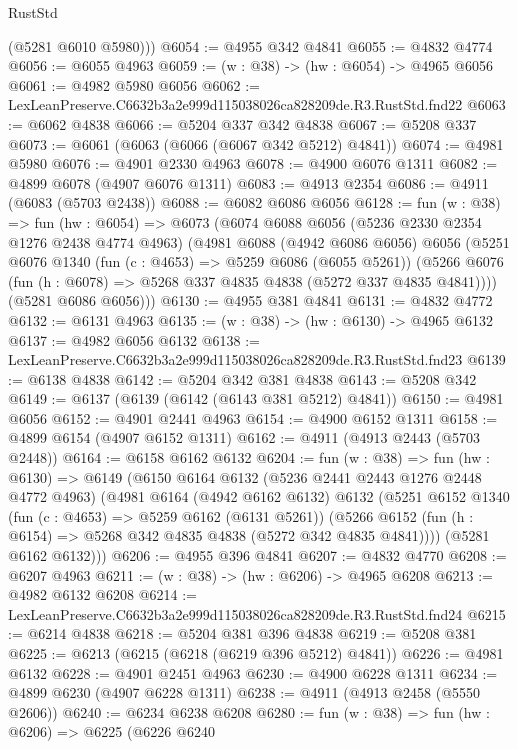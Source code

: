 \begin{lexlean}{RustStd}
\begin{coremodule}
        (@5281 @6010 @5980)))
@6054 := @4955 @342 @4841
@6055 := @4832 @4774
@6056 := @6055 @4963
@6059 := (w : @38) -> (hw : @6054) -> @4965 @6056
@6061 := @4982 @5980 @6056
@6062 := LexLeanPreserve.C6632b3a2e999d115038026ca828209de.R3.RustStd.fnd22
@6063 := @6062 @4838
@6066 := @5204 @337 @342 @4838
@6067 := @5208 @337
@6073 := @6061 (@6063 (@6066 (@6067 @342 @5212) @4841))
@6074 := @4981 @5980
@6076 := @4901 @2330 @4963
@6078 := @4900 @6076 @1311
@6082 := @4899 @6078 (@4907 @6076 @1311)
@6083 := @4913 @2354
@6086 := @4911 (@6083 (@5703 @2438))
@6088 := @6082 @6086 @6056
@6128 := fun (w : @38) =>
  fun (hw : @6054) =>
  @6073
    (@6074
      @6088
      @6056
      (@5236 @2330 @2354 @1276 @2438 @4774 @4963)
      (@4981
        @6088
        (@4942 @6086 @6056)
        @6056
        (@5251
          @6076
          @1340
          (fun (c : @4653) => @5259 @6086 (@6055 @5261))
          (@5266 @6076 (fun (h : @6078) => @5268 @337 @4835 @4838 (@5272 @337 @4835 @4841))))
        (@5281 @6086 @6056)))
@6130 := @4955 @381 @4841
@6131 := @4832 @4772
@6132 := @6131 @4963
@6135 := (w : @38) -> (hw : @6130) -> @4965 @6132
@6137 := @4982 @6056 @6132
@6138 := LexLeanPreserve.C6632b3a2e999d115038026ca828209de.R3.RustStd.fnd23
@6139 := @6138 @4838
@6142 := @5204 @342 @381 @4838
@6143 := @5208 @342
@6149 := @6137 (@6139 (@6142 (@6143 @381 @5212) @4841))
@6150 := @4981 @6056
@6152 := @4901 @2441 @4963
@6154 := @4900 @6152 @1311
@6158 := @4899 @6154 (@4907 @6152 @1311)
@6162 := @4911 (@4913 @2443 (@5703 @2448))
@6164 := @6158 @6162 @6132
@6204 := fun (w : @38) =>
  fun (hw : @6130) =>
  @6149
    (@6150
      @6164
      @6132
      (@5236 @2441 @2443 @1276 @2448 @4772 @4963)
      (@4981
        @6164
        (@4942 @6162 @6132)
        @6132
        (@5251
          @6152
          @1340
          (fun (c : @4653) => @5259 @6162 (@6131 @5261))
          (@5266 @6152 (fun (h : @6154) => @5268 @342 @4835 @4838 (@5272 @342 @4835 @4841))))
        (@5281 @6162 @6132)))
@6206 := @4955 @396 @4841
@6207 := @4832 @4770
@6208 := @6207 @4963
@6211 := (w : @38) -> (hw : @6206) -> @4965 @6208
@6213 := @4982 @6132 @6208
@6214 := LexLeanPreserve.C6632b3a2e999d115038026ca828209de.R3.RustStd.fnd24
@6215 := @6214 @4838
@6218 := @5204 @381 @396 @4838
@6219 := @5208 @381
@6225 := @6213 (@6215 (@6218 (@6219 @396 @5212) @4841))
@6226 := @4981 @6132
@6228 := @4901 @2451 @4963
@6230 := @4900 @6228 @1311
@6234 := @4899 @6230 (@4907 @6228 @1311)
@6238 := @4911 (@4913 @2458 (@5550 @2606))
@6240 := @6234 @6238 @6208
@6280 := fun (w : @38) =>
  fun (hw : @6206) =>
  @6225
    (@6226
      @6240

\end{coremodule}
\end{lexlean}
